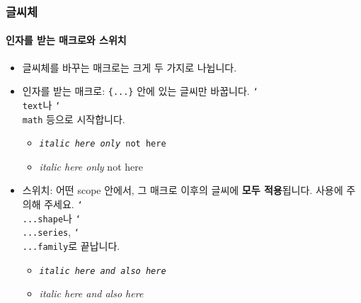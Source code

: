   \begin{frame}[fragile]
    \frametitle{글씨체}
    \framesubtitle{인자를 받는 매크로와 스위치}
    \begin{itemize}
      \item 글씨체를 바꾸는 매크로는 크게 두 가지로 나뉩니다.
      \item 인자를 받는 매크로: \texttt{\{...\}} 안에 있는 글씨만 바꿉니다. \texttt{\char`\\text}나 \texttt{\char`\\math} 등으로 시작합니다.
      \begin{itemize}
        \item \texttt{\textit{italic here only} not here}
        \item \textit{italic here only} not here
      \end{itemize}
      \item 스위치: 어떤 scope 안에서, 그 매크로 이후의 글씨에 \textbf{모두 적용}됩니다. 사용에 주의해 주세요. \texttt{\char`\\...shape}나 \texttt{\char`\\...series}, \texttt{\char`\\...family}로 끝납니다.
      \begin{itemize}
        \item \texttt{\itshape{italic here and} also here}
        \item \itshape{italic here and} also here
      \end{itemize}
    \end{itemize}
  \end{frame}
  
